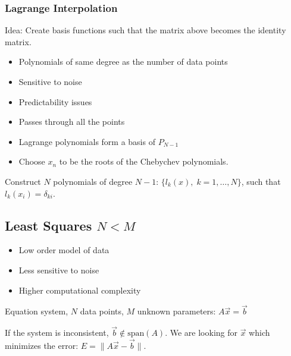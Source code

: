 \documentclass[8pt,a4paper]{scrartcl}
\renewcommand{\compaq}{\setlength{\itemsep}{0mm}\setlength{\parskip}{0cm}}
\begin{document}
\begin{multicols*}{3}
\subsubsection{Lagrange Interpolation}

Idea: Create basis functions such that the matrix above becomes the identity matrix.

\begin{itemize}\compaq

\item Polynomials of same degree as the number of data points
\item Sensitive to noise
\item Predictability issues
\item Passes through all the points
\item Lagrange polynomials form a basis of $P_{N-1}$
\item Choose $x_n$ to be the roots of the Chebychev polynomials.
\end{itemize} 
Construct $N$ polynomials of degree $N-1$: $\{ l_k (x), \; k = 1, \dots, N \}$, such that $l_k (x_i) = \delta_{ki}$.



\subsection{Least Squares $N < M$}

\begin{itemize}\compaq
\item Low order model of data
\item Less sensitive to noise
\item Higher computational complexity
\end{itemize} 
Equation system, $N$ data points, $M$ unknown parameters: $A \vec x = \vec b$

If the system is inconsistent, $\vec{b}\notin\text{span}(A)$. We are looking for $\vec{x}$ which minimizes the error: $E = \|A \vec{x} - \vec b\|$. 
	

\end{multicols*}
\end{document}
